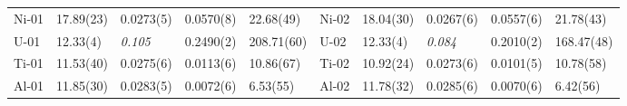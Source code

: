 \begin{table*}[h!]
{\begin{tabular}{@{}lllll|lllll@{}}
\midrule
Ni-01 & 17.89(23) & 0.0273(5)     & 0.0570(8)   & 22.68(49)   & Ni-02 & 18.04(30) & 0.0267(6) & 0.0557(6) & 21.78(43)                                                                      \\
U-01 & 12.33(4) & \emph{0.105}     & 0.2490(2)   & 208.71(60)   & U-02 & 12.33(4) & \emph{0.084} & 0.2010(2) & 168.47(48)                                                                      \\
Ti-01 & 11.53(40) & 0.0275(6)     & 0.0113(6)   & 10.86(67)   & Ti-02 & 10.92(24) & 0.0273(6) & 0.0101(5) & 10.78(58)                                                                      \\
Al-01 & 11.85(30) & 0.0283(5)     & 0.0072(6)   & 6.53(55)   & Al-02 & 11.78(32) & 0.0285(6) & 0.0070(6) & 6.42(56)                                                                      \\
 \bottomrule\bottomrule
\end{tabular}
}
\end{table*}

% 
% 
% 
% 





